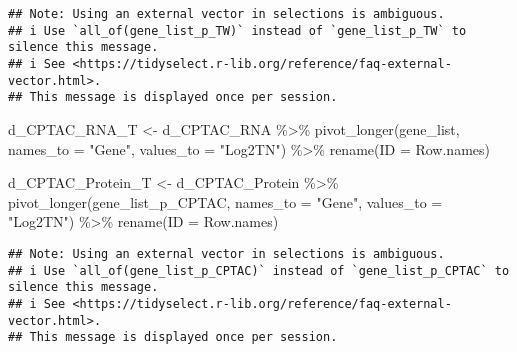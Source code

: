 \documentclass[
]{article}
\newenvironment{Shaded}{\begin{snugshade}}{\end{snugshade}}
\newcommand{\AttributeTok}[1]{\textcolor[rgb]{0.77,0.63,0.00}{#1}}
\newcommand{\FunctionTok}[1]{\textcolor[rgb]{0.00,0.00,0.00}{#1}}
\newcommand{\NormalTok}[1]{#1}
\newcommand{\OtherTok}[1]{\textcolor[rgb]{0.56,0.35,0.01}{#1}}
\newcommand{\SpecialCharTok}[1]{\textcolor[rgb]{0.00,0.00,0.00}{#1}}
\newcommand{\StringTok}[1]{\textcolor[rgb]{0.31,0.60,0.02}{#1}}
\begin{document}
\begin{verbatim}
## Note: Using an external vector in selections is ambiguous.
## i Use `all_of(gene_list_p_TW)` instead of `gene_list_p_TW` to silence this message.
## i See <https://tidyselect.r-lib.org/reference/faq-external-vector.html>.
## This message is displayed once per session.
\end{verbatim}

\begin{Shaded}
\begin{Highlighting}[]
\NormalTok{d\_CPTAC\_RNA\_T }\OtherTok{\textless{}{-}}\NormalTok{ d\_CPTAC\_RNA }\SpecialCharTok{\%\textgreater{}\%} 
  \FunctionTok{pivot\_longer}\NormalTok{(gene\_list, }\AttributeTok{names\_to =} \StringTok{"Gene"}\NormalTok{, }\AttributeTok{values\_to =} \StringTok{"Log2TN"}\NormalTok{) }\SpecialCharTok{\%\textgreater{}\%}
  \FunctionTok{rename}\NormalTok{(}\AttributeTok{ID =}\NormalTok{ Row.names)}

\NormalTok{d\_CPTAC\_Protein\_T }\OtherTok{\textless{}{-}}\NormalTok{ d\_CPTAC\_Protein }\SpecialCharTok{\%\textgreater{}\%} 
  \FunctionTok{pivot\_longer}\NormalTok{(gene\_list\_p\_CPTAC, }\AttributeTok{names\_to =} \StringTok{"Gene"}\NormalTok{, }\AttributeTok{values\_to =} \StringTok{"Log2TN"}\NormalTok{) }\SpecialCharTok{\%\textgreater{}\%}
  \FunctionTok{rename}\NormalTok{(}\AttributeTok{ID =}\NormalTok{ Row.names)}
\end{Highlighting}
\end{Shaded}

\begin{verbatim}
## Note: Using an external vector in selections is ambiguous.
## i Use `all_of(gene_list_p_CPTAC)` instead of `gene_list_p_CPTAC` to silence this message.
## i See <https://tidyselect.r-lib.org/reference/faq-external-vector.html>.
## This message is displayed once per session.
\end{verbatim}
\end{document}
